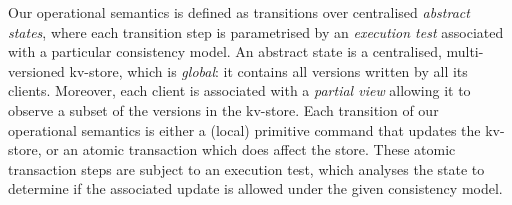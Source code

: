 





Our operational semantics is defined as transitions over centralised \emph{abstract states}, where each transition 
step is parametrised by an \emph{execution test} associated with a particular
consistency model.
An abstract state is a centralised, multi-versioned kv-store, which is {\em global}:
it contains all versions written by all its clients. 
Moreover, each client is associated with a \emph{partial view} allowing it to observe a subset of 
the versions in the kv-store. 
Each transition of our operational semantics is either
a (local) primitive command that updates the kv-store, 
or an atomic transaction which does affect the store. 
These atomic transaction steps are subject to an execution test, which
analyses the state to determine if the associated update is allowed under  
the given consistency model. 


